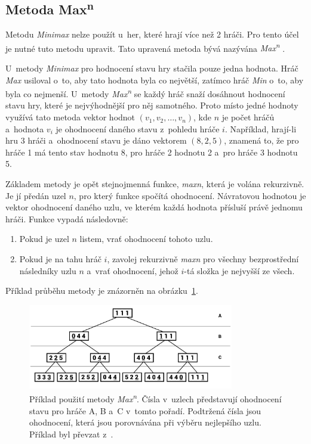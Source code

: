 \subsection*{Metoda Max\textsuperscript{n}}

Metodu \emph{Minimax} nelze použít u~her, které hrají více než 2 hráči. Pro tento účel je nutné tuto metodu upravit. Tato upravená metoda bývá nazývána \emph{Max\textsuperscript{n}} \cite{Maxn}.

U~metody \emph{Minimax} pro hodnocení stavu hry stačila pouze jedna hodnota. Hráč \emph{Max} usiloval o~to, aby tato hodnota byla co největší, zatímco hráč \emph{Min} o~to, aby byla co nejmenší. U~metody \emph{Max\textsuperscript{n}} se každý hráč snaží dosáhnout hodnocení stavu hry, které je nejvýhodnější pro něj samotného. Proto místo jedné hodnoty využívá tato metoda vektor hodnot $(v_1, v_2, \ldots, v_n)$, kde $n$ je počet hráčů a~hodnota $v_i$ je ohodnocení daného stavu z~pohledu hráče $i$. Například, hrají-li hru 3 hráči a~ohodnocení stavu je dáno vektorem $(8, 2, 5)$, znamená to, že pro hráče 1 má tento stav hodnotu 8, pro hráče 2 hodnotu 2 a~pro hráče 3 hodnotu 5.

Základem metody je opět stejnojmenná funkce, \emph{maxn}, která je volána rekurzivně. Je jí předán uzel $n$, pro který funkce spočítá ohodnocení. Návratovou hodnotou je vektor ohodnocení daného uzlu, ve kterém každá hodnota přísluší právě jednomu hráči. Funkce vypadá následovně:
\begin{enumerate}
    \item Pokud je uzel $n$ listem, vrať ohodnocení tohoto uzlu.
    \item Pokud je na tahu hráč $i$, zavolej rekurzivně \emph{maxn} pro všechny bezprostřední následníky uzlu $n$ a~vrať ohodnocení, jehož $i$-tá složka je nejvyšší ze všech.
\end{enumerate}
Příklad průběhu metody je znázorněn na obrázku~\ref{fig:maxn}.

\begin{figure}[ht]
    \centering
    \includegraphics[width=0.8\textwidth]{doc/obrazky-figures/maxn.pdf}
    \caption{Příklad použití metody \emph{Max\textsuperscript{n}}. Čísla v~uzlech představují ohodnocení stavu pro hráče A, B a~C v~tomto pořadí. Podtržená čísla jsou ohodnocení, která jsou porovnávána při výběru nejlepšího uzlu. Příklad byl převzat z~\cite{Maxn}.}
    \label{fig:maxn}
\end{figure}


